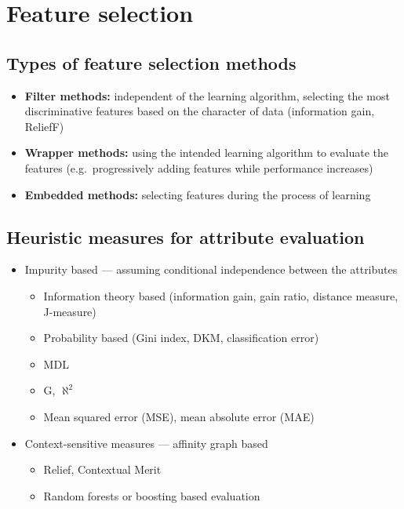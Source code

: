 \documentclass{article}
\begin{document}
    \newpage

\section{Feature selection}
    \subsection{Types of feature selection methods}
    \begin{itemize}
        \item \textbf{Filter methods:} independent of the learning algorithm, selecting the most discriminative features based on the character of data (information gain, ReliefF)
        \item \textbf{Wrapper methods:} using the intended learning algorithm to evaluate the features (e.g.\ progressively adding features while performance increases)
        \item \textbf{Embedded methods:} selecting features during the process of learning
    \end{itemize}

    \subsection{Heuristic measures for attribute evaluation}
    \begin{itemize}
        \item Impurity based --- assuming conditional independence between the attributes
        \begin{itemize}
            \item Information theory based (information gain, gain ratio, distance measure, J-measure)
            \item Probability based (Gini index, DKM, classification error)
            \item MDL
            \item G, $\aleph^2$
            \item Mean squared error (MSE), mean absolute error (MAE)
        \end{itemize}
        \item Context-sensitive measures --- affinity graph based
        \begin{itemize}
            \item Relief, Contextual Merit
            \item Random forests or boosting based evaluation
        \end{itemize}
    \end{itemize}
\end{document}
